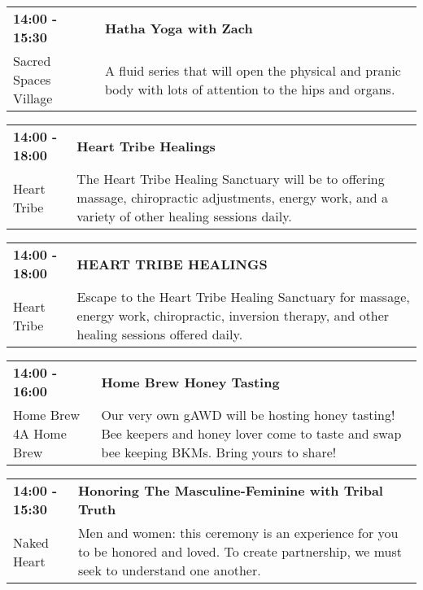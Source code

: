 \begin{tabular}{ p{1in} p{2.2in} }
    \textbf{14:00 - 15:30} & \textbf{Hatha Yoga with Zach} \\
    Sacred Spaces Village \newline  & A fluid series that will open the physical and pranic body with lots of attention to the hips and organs. \\
    \hline 
\end{tabular}
    
\begin{tabular}{ p{1in} p{2.2in} }
    \textbf{14:00 - 18:00} & \textbf{Heart Tribe Healings} \\
    Heart Tribe \newline  & The Heart Tribe Healing Sanctuary will be to offering massage, chiropractic adjustments, energy work, and a variety of other healing sessions daily. \\
    \hline 
\end{tabular}
    
\begin{tabular}{ p{1in} p{2.2in} }
    \textbf{14:00 - 18:00} & \textbf{HEART TRIBE HEALINGS} \\
    Heart Tribe \newline  & Escape to the Heart Tribe Healing Sanctuary for massage, energy work, chiropractic, inversion therapy, and other healing sessions offered daily. \\
    \hline 
\end{tabular}
    
\begin{tabular}{ p{1in} p{2.2in} }
    \textbf{14:00 - 16:00} & \textbf{Home Brew Honey Tasting} \\
    Home Brew 4A Home Brew \newline  & Our very own gAWD will be hosting honey tasting! Bee keepers and honey lover come to taste and swap bee keeping BKMs. Bring yours to share! \\
    \hline 
\end{tabular}
    
\begin{tabular}{ p{1in} p{2.2in} }
    \textbf{14:00 - 15:30} & \textbf{Honoring The Masculine-Feminine with Tribal Truth} \\
    Naked Heart \newline  & Men and women: this ceremony is an experience for you to be honored and loved. To create partnership, we must seek to understand one another. \\
    \hline 
\end{tabular}
    
